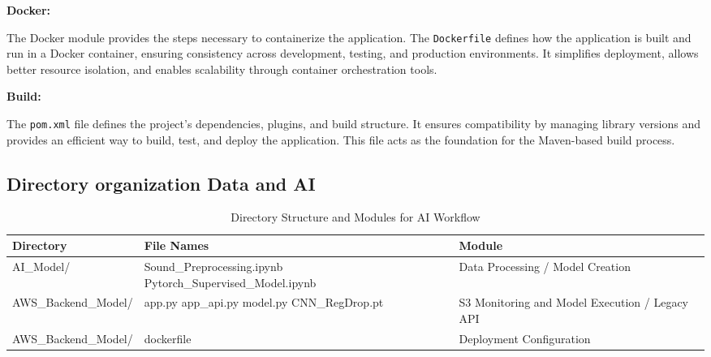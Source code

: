\documentclass[conference]{IEEEtran}
\begin{document}
\vspace{0.5cm}

\textbf{Docker:}  

The Docker module provides the steps necessary to containerize the application. The \texttt{Dockerfile} defines how the application is built and run in a Docker container, ensuring consistency across development, testing, and production environments. It simplifies deployment, allows better resource isolation, and enables scalability through container orchestration tools.

\vspace{0.5cm}

\textbf{Build:}  

The \texttt{pom.xml} file defines the project's dependencies, plugins, and build structure. It ensures compatibility by managing library versions and provides an efficient way to build, test, and deploy the application. This file acts as the foundation for the Maven-based build process.

\subsection{Directory organization Data and AI}
\begin{table}[H]
\centering
\renewcommand{\arraystretch}{1.5}
\begin{tabular}{|m{2.6cm}|m{3.5cm}|m{1.6cm}|}
\hline
\textbf{Directory} & \textbf{File Names} & \textbf{Module} \\ \hline

AI\_Model/ & 
Sound\_Preprocessing.ipynb \newline 
Pytorch\_Supervised\_Model.ipynb & 
Data Processing / Model Creation \\ \hline

AWS\_Backend\_Model/ & 
app.py \newline 
app\_api.py \newline 
model.py \newline 
CNN\_RegDrop.pt & 
S3 Monitoring and Model Execution / Legacy API \\ \hline

AWS\_Backend\_Model/ & 
dockerfile & 
Deployment Configuration \\ \hline

\end{tabular}
\caption{Directory Structure and Modules for AI Workflow}
\label{table:workflow_structure}
\end{table}
\end{document}
